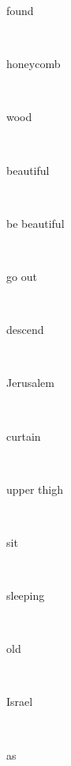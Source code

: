 \documentclass[a4paper]{article}
\begin{document}
\begin{multicols}{4}
\begin{multicols}{4}
\begin{multicols}{5}
{\hebrewfont{}} \begin{english}found\end{english}\\
{\hebrewfont{}} \begin{english}honeycomb\end{english}\\
{\hebrewfont{}} \begin{english}wood\end{english}\\
{\hebrewfont{}} \begin{english}beautiful\end{english}\\
{\hebrewfont{}} \begin{english}be beautiful\end{english}\\
{\hebrewfont{}} \begin{english}go out\end{english}\\
{\hebrewfont{}} \begin{english}descend\end{english}\\
{\hebrewfont{}} \begin{english}Jerusalem\end{english}\\
{\hebrewfont{}} \begin{english}curtain\end{english}\\
{\hebrewfont{}} \begin{english}upper thigh\end{english}\\
{\hebrewfont{}} \begin{english}sit\end{english}\\
{\hebrewfont{}} \begin{english}sleeping\end{english}\\
{\hebrewfont{}} \begin{english}old\end{english}\\
{\hebrewfont{}} \begin{english}Israel\end{english}\\
{\hebrewfont{}} \begin{english}as\end{english}\\

\end{multicols}
\end{multicols}
\end{multicols}
\end{document}
